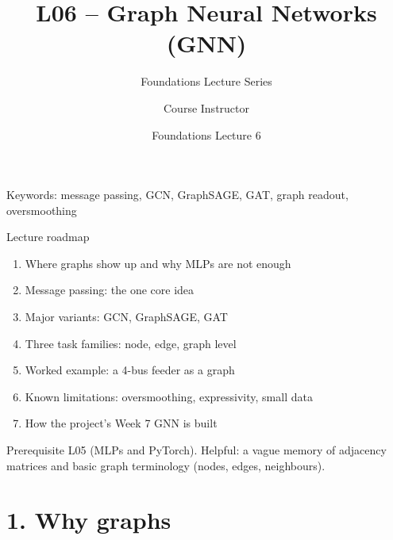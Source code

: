 \documentclass[aspectratio=169,10pt]{beamer}
\title[L06: GNN]{L06 -- Graph Neural Networks (GNN)}
\subtitle{Foundations Lecture Series}
\author{Course Instructor}
\institute{Microgrid 3-phase Security AI Project}
\date{Foundations Lecture 6}
\begin{document}
\begin{frame}
  \titlepage
  \vspace{-0.8em}
  \begin{center}
    \small Keywords: message passing, GCN, GraphSAGE, GAT, graph readout, oversmoothing
  \end{center}
\end{frame}

\begin{frame}{Lecture roadmap}
\begin{enumerate}
  \item Where graphs show up and why MLPs are not enough
  \item Message passing: the one core idea
  \item Major variants: GCN, GraphSAGE, GAT
  \item Three task families: node, edge, graph level
  \item Worked example: a 4-bus feeder as a graph
  \item Known limitations: oversmoothing, expressivity, small data
  \item How the project's Week 7 GNN is built
\end{enumerate}
\vspace{0.6em}
\begin{block}{Prerequisite}
L05 (MLPs and PyTorch). Helpful: a vague memory of adjacency matrices and basic graph terminology (nodes, edges, neighbours).
\end{block}
\end{frame}

\section*{1. Why graphs}
\end{document}
